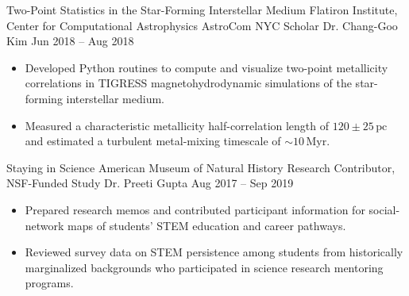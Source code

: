 \vspace{0.4em}

\researchentry
  {Two-Point Statistics in the Star-Forming Interstellar Medium}
  {Flatiron Institute, Center for Computational Astrophysics}
  {AstroCom NYC Scholar}
  {Dr. Chang-Goo Kim}
  {Jun 2018 -- Aug 2018}
  {}

\begin{itemize}[
  leftmargin=1em,
  label={--},
  itemsep=3pt,
  topsep=0pt,
  parsep=0pt,
  partopsep=0pt
]
\item Developed Python routines to compute and visualize two-point
metallicity correlations in TIGRESS magnetohydrodynamic simulations of the
star-forming interstellar medium.

\item Measured a characteristic metallicity half-correlation length of
$120\pm25\,\mathrm{pc}$ and estimated a turbulent metal-mixing timescale of
$\sim10\,\mathrm{Myr}$.
\end{itemize}

\researchentry
  {Staying in Science}
  {American Museum of Natural History}
  {Research Contributor, NSF-Funded Study}
  {Dr. Preeti Gupta}
  {Aug 2017 -- Sep 2019}
  {}

\begin{itemize}[
  leftmargin=1em,
  label={--},
  itemsep=3pt,
  topsep=0pt,
  parsep=0pt,
  partopsep=0pt
]
\item Prepared research memos and contributed participant information for
social-network maps of students' STEM education and career pathways.

\item Reviewed survey data on STEM persistence among students from
historically marginalized backgrounds who participated in science research
mentoring programs.
\end{itemize}

\vspace{0.4em}
